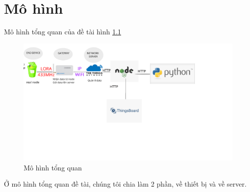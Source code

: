 
\chapter{ Mô hình}

Mô hình tổng quan của đề tài hình \ref{fig:general_chart}
\begin{figure}[H]
    \centering
    \includegraphics[width=\textwidth]{images/Quanh/general_chart.png}
    \caption{Mô hình tổng quan}
    \label{fig:general_chart}
\end{figure}
Ở mô hình tổng quan đề tài, chúng tôi chia làm 2 phần, về thiết bị và về server.

